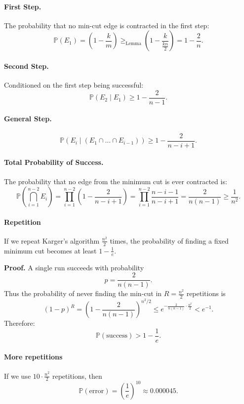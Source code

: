 \documentclass{article}
\begin{document}
\paragraph{First Step.}
The probability that no min-cut edge is contracted in the first step:
\[
\mathbb{P}(E_1) = \left(1 - \frac{k}{m}\right)
\ge_{\text{Lemma}} \left(1 - \frac{k}{\frac{kn}{2}}\right)
= 1 - \frac{2}{n}.
\]

\paragraph{Second Step.}
Conditioned on the first step being successful:
\[
\mathbb{P}(E_2 \mid E_1) \ge 1 - \frac{2}{n - 1}.
\]

\paragraph{General Step.}
\[
\mathbb{P}(E_i \mid (E_1 \cap \dots \cap E_{i-1})) \ge 1 - \frac{2}{n - i + 1}.
\]

\paragraph{Total Probability of Success.}
The probability that no edge from the minimum cut is ever contracted is:
\[
\mathbb{P}\!\left(\bigcap_{i=1}^{n-2} E_i\right)
= \prod_{i=1}^{n-2} \left(1 - \frac{2}{n - i + 1}\right)
= \prod_{i=1}^{n-2} \frac{n - i - 1}{n - i + 1}
= \frac{2}{n(n - 1)} \ge \frac{1}{n^2}.
\]

\paragraph{Repetition}
If we repeat Karger's algorithm $\frac{n^{2}}{2}$ times, the probability of finding a fixed minimum cut becomes at least $1-\frac{1}{e}$.

\textbf{Proof.}
A single run succeeds with probability
\[
p = \frac{2}{n(n-1)}.
\]
Thus the probability of never finding the min-cut in $R=\frac{n^{2}}{2}$ repetitions is
\[
(1-p)^{R}
= \left(1 - \frac{2}{n(n-1)}\right)^{n^{2}/2}
\le e^{-\frac{2}{n(n-1)} \cdot \frac{n^{2}}{2}}
< e^{-1}.
\]
Therefore:
\[
\mathbb{P}(\text{success}) > 1 - \frac{1}{e}.
\]

\paragraph{More repetitions}
If we use $10 \cdot \frac{n^{2}}{2}$ repetitions, then
\[
\mathbb{P}(\text{error}) = \left(\frac{1}{e}\right)^{10} \approx 0.000045.
\]
\end{document}

